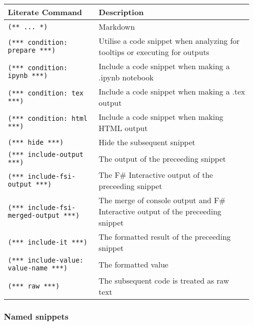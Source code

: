 \documentclass{article}
\begin{document}
\begin{tabular}{|l|l|}\hline
\textbf{Literate Command} & \textbf{Description}\\ \hline\hline
\texttt{(** ... *)} & Markdown\\ \hline
\texttt{(*** condition: prepare ***)} & Utilise a code snippet when analyzing for tooltips or executing for outputs\\ \hline
\texttt{(*** condition: ipynb ***)} & Include a code snippet when making a .ipynb notebook\\ \hline
\texttt{(*** condition: tex ***)} & Include a code snippet when making a .tex output\\ \hline
\texttt{(*** condition: html ***)} & Include a code snippet when making HTML output\\ \hline
\texttt{(*** hide ***)} & Hide the subsequent snippet\\ \hline
\texttt{(*** include-output ***)} & The output of the preceeding snippet\\ \hline
\texttt{(*** include-fsi-output ***)} & The F\# Interactive output of the preceeding snippet\\ \hline
\texttt{(*** include-fsi-merged-output ***)} & The merge of console output and F\# Interactive output of the preceeding snippet\\ \hline
\texttt{(*** include-it ***)} & The formatted result of the preceeding snippet\\ \hline
\texttt{(*** include-value: value-name ***)} & The formatted value\\ \hline
\texttt{(*** raw ***)} & The subsequent code is treated as raw text\\ \hline
\end{tabular}

\subsubsection*{Named snippets}
\end{document}

